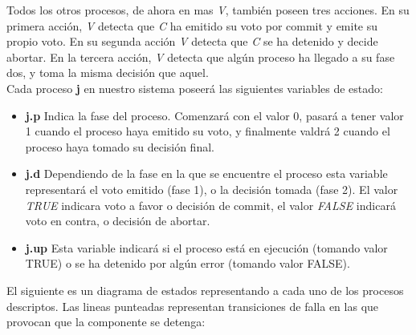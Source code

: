 \documentclass[titlepage, 12pt]{book}
\begin{document}
Todos los otros procesos, de ahora en mas \textit{V}, tambi\'en poseen tres acciones. En su primera acci\'on, \textit{V} detecta que \textit{C} ha emitido su voto por commit y emite su propio voto. En su segunda acci\'on \textit{V} detecta que \textit{C} se ha detenido y decide abortar. En la tercera acci\'on, \textit{V} detecta que alg\'un proceso ha llegado a su fase dos, y toma la misma decisi\'on que aquel.\\

Cada proceso \textbf{j} en nuestro sistema poseer\'a las siguientes variables de estado:
\begin{itemize}
\item \textbf{j.p} Indica la fase del proceso. Comenzar\'a con el valor 0, pasar\'a a tener valor 1 cuando el proceso haya emitido su voto, y finalmente valdr\'a 2 cuando el proceso haya tomado su decisi\'on final.
\item \textbf{j.d} Dependiendo de la fase en la que se encuentre el proceso esta variable representar\'a el voto emitido (fase 1), o la decisi\'on tomada (fase 2). El valor \textit{TRUE} indicara voto a favor o decisi\'on de commit, el valor \textit{FALSE} indicar\'a voto en contra, o decisi\'on de abortar.
\item \textbf{j.up} Esta variable indicar\'a si el proceso est\'a en ejecuci\'on (tomando valor TRUE) o se ha detenido por alg\'un error (tomando valor FALSE).
\end{itemize}

El siguiente es un diagrama de estados representando a cada uno de los procesos descriptos. Las lineas punteadas representan transiciones de falla en las que provocan que la componente se detenga:
\end{document}
